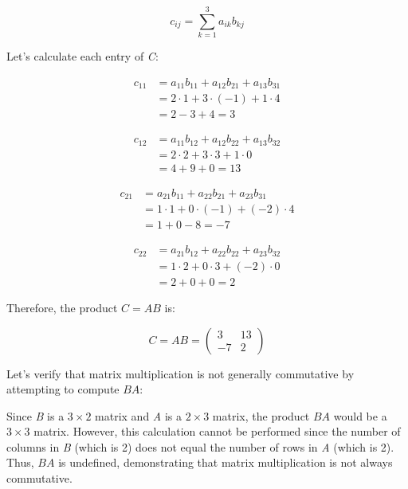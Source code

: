 \[
    c_{ij} = \sum_{k=1}^{3} a_{ik} b_{kj}
\]

Let's calculate each entry of \emph{C}:

\begin{align*}
    c_{11} &= a_{11}b_{11} + a_{12}b_{21} + a_{13}b_{31} \\
    &= 2 \cdot 1 + 3 \cdot (-1) + 1 \cdot 4 \\
    &= 2 - 3 + 4 = 3
\end{align*}

\begin{align*}
    c_{12} &= a_{11}b_{12} + a_{12}b_{22} + a_{13}b_{32} \\
    &= 2 \cdot 2 + 3 \cdot 3 + 1 \cdot 0 \\
    &= 4 + 9 + 0 = 13
\end{align*}

\begin{align*}
    c_{21} &= a_{21}b_{11} + a_{22}b_{21} + a_{23}b_{31} \\
    &= 1 \cdot 1 + 0 \cdot (-1) + (-2) \cdot 4 \\
    &= 1 + 0 - 8 = -7
\end{align*}

\begin{align*}
    c_{22} &= a_{21}b_{12} + a_{22}b_{22} + a_{23}b_{32} \\
    &= 1 \cdot 2 + 0 \cdot 3 + (-2) \cdot 0 \\
    &= 2 + 0 + 0 = 2
\end{align*}

Therefore, the product \(C = AB\) is:

\[
    C = AB = 
    \begin{pmatrix}
    3 & 13 \\
    -7 & 2
    \end{pmatrix}
\]

Let's verify that matrix multiplication is not generally commutative by attempting to compute \(BA\):
\vspace{\baselineskip}

Since \emph{B} is a \(3 \times 2\) matrix and \emph{A} is a \(2 \times 3\) matrix, the product \(BA\) would be a \(3 \times 3\) matrix. However, this calculation cannot be performed since the number of columns in \emph{B} (which is 2) does not equal the number of rows in \emph{A} (which is 2). Thus, \(BA\) is undefined, demonstrating that matrix multiplication is not always commutative.
\vspace{\baselineskip}

